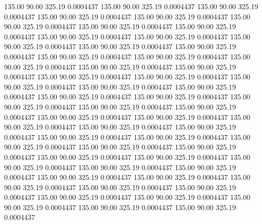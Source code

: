  135.00   90.00  325.19   0.0004437
 135.00   90.00  325.19   0.0004437
 135.00   90.00  325.19   0.0004437
 135.00   90.00  325.19   0.0004437
 135.00   90.00  325.19   0.0004437
 135.00   90.00  325.19   0.0004437
 135.00   90.00  325.19   0.0004437
 135.00   90.00  325.19   0.0004437
 135.00   90.00  325.19   0.0004437
 135.00   90.00  325.19   0.0004437
 135.00   90.00  325.19   0.0004437
 135.00   90.00  325.19   0.0004437
 135.00   90.00  325.19   0.0004437
 135.00   90.00  325.19   0.0004437
 135.00   90.00  325.19   0.0004437
 135.00   90.00  325.19   0.0004437
 135.00   90.00  325.19   0.0004437
 135.00   90.00  325.19   0.0004437
 135.00   90.00  325.19   0.0004437
 135.00   90.00  325.19   0.0004437
 135.00   90.00  325.19   0.0004437
 135.00   90.00  325.19   0.0004437
 135.00   90.00  325.19   0.0004437
 135.00   90.00  325.19   0.0004437
 135.00   90.00  325.19   0.0004437
 135.00   90.00  325.19   0.0004437
 135.00   90.00  325.19   0.0004437
 135.00   90.00  325.19   0.0004437
 135.00   90.00  325.19   0.0004437
 135.00   90.00  325.19   0.0004437
 135.00   90.00  325.19   0.0004437
 135.00   90.00  325.19   0.0004437
 135.00   90.00  325.19   0.0004437
 135.00   90.00  325.19   0.0004437
 135.00   90.00  325.19   0.0004437
 135.00   90.00  325.19   0.0004437
 135.00   90.00  325.19   0.0004437
 135.00   90.00  325.19   0.0004437
 135.00   90.00  325.19   0.0004437
 135.00   90.00  325.19   0.0004437
 135.00   90.00  325.19   0.0004437
 135.00   90.00  325.19   0.0004437
 135.00   90.00  325.19   0.0004437
 135.00   90.00  325.19   0.0004437
 135.00   90.00  325.19   0.0004437
 135.00   90.00  325.19   0.0004437
 135.00   90.00  325.19   0.0004437
 135.00   90.00  325.19   0.0004437
 135.00   90.00  325.19   0.0004437
 135.00   90.00  325.19   0.0004437
 135.00   90.00  325.19   0.0004437
 135.00   90.00  325.19   0.0004437
 135.00   90.00  325.19   0.0004437
